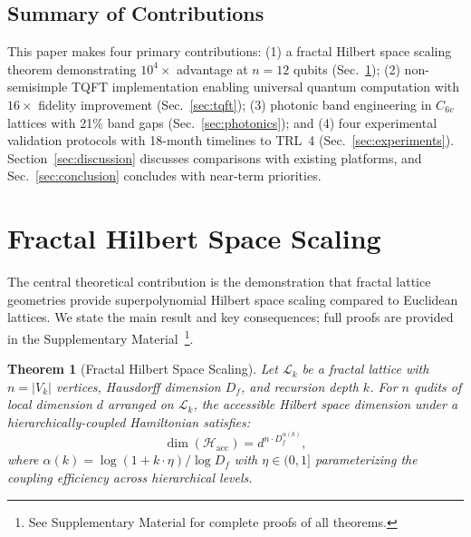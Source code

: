 \documentclass[aps,prx,twocolumn,groupedaddress,longbibliography]{revtex4-2}
\newcommand{\Hilbert}{\mathcal{H}}
\newcommand{\Df}{D_f}
\theoremstyle{plain}
\newtheorem{theorem}{Theorem}[section]
\theoremstyle{definition}
\begin{document}
\subsection{Summary of Contributions}

This paper makes four primary contributions: (1) a fractal Hilbert space scaling theorem demonstrating $10^4\times$ advantage at $n = 12$ qubits (Sec.~\ref{sec:hilbert}); (2) non-semisimple TQFT implementation enabling universal quantum computation with $16\times$ fidelity improvement (Sec.~\ref{sec:tqft}); (3) photonic band engineering in $C_{6v}$ lattices with 21\% band gaps (Sec.~\ref{sec:photonics}); and (4) four experimental validation protocols with 18-month timelines to TRL~4 (Sec.~\ref{sec:experiments}). Section~\ref{sec:discussion} discusses comparisons with existing platforms, and Sec.~\ref{sec:conclusion} concludes with near-term priorities.


\section{Fractal Hilbert Space Scaling}
\label{sec:hilbert}

The central theoretical contribution is the demonstration that fractal lattice geometries provide superpolynomial Hilbert space scaling compared to Euclidean lattices. We state the main result and key consequences; full proofs are provided in the Supplementary Material~\footnote{See Supplementary Material for complete proofs of all theorems.}.

\begin{theorem}[Fractal Hilbert Space Scaling]
\label{thm:main}
Let $\mathcal{L}_k$ be a fractal lattice with $n = |V_k|$ vertices, Hausdorff dimension $\Df$, and recursion depth $k$. For $n$ qudits of local dimension $d$ arranged on $\mathcal{L}_k$, the accessible Hilbert space dimension under a hierarchically-coupled Hamiltonian satisfies:
\begin{equation}
\dim(\Hilbert_\mathrm{acc}) = d^{n \cdot \Df^{\alpha(k)}},
\label{eq:main_theorem}
\end{equation}
where $\alpha(k) = \log(1 + k \cdot \eta)/\log \Df$ with $\eta \in (0,1]$ parameterizing the coupling efficiency across hierarchical levels.
\end{theorem}
\end{document}
